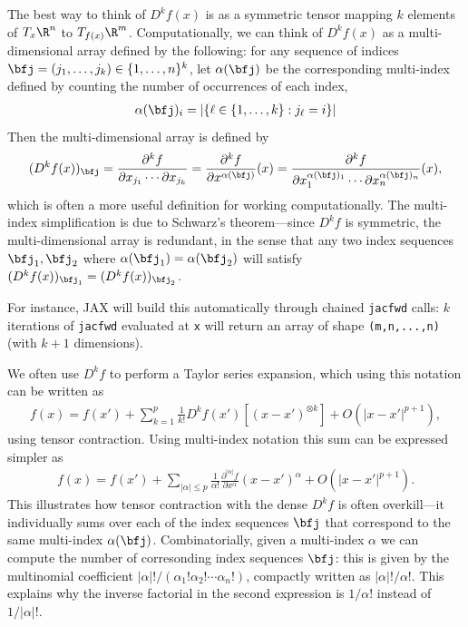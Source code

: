 \documentclass{article}
\theoremstyle{plain}
\theoremstyle{remark}
\begin{document}
The best way to think of $D^kf(x)$ is as a symmetric tensor mapping $k$ elements of $T_x\R^n$ to $T_{f(x)}\R^m$. 
Computationally, we can think of $D^kf(x)$ as a multi-dimensional array defined by the following: for any sequence of indices $\bfj = (j_1,\dots,j_k) \in \{1,\dots,n\}^k$, 
let $\alpha(\bfj)$ be the corresponding multi-index defined by counting the number of occurrences of each index,
\begin{align*}
    \alpha(\bfj)_i = |\{\ell\in\{1,\dots,k\} : j_\ell = i\}|
\end{align*}
Then the multi-dimensional array is defined by
\begin{align*}
    (D^kf(x))_{\bfj} 
    = \frac{\partial^k f}{\partial x_{j_1} \cdots \partial x_{j_k}} 
    = \frac{\partial^k f}{\partial x^{\alpha(\bfj)}}(x) = \frac{\partial^k f}{\partial x^{\alpha(\bfj)_1}_1 \cdots\partial x^{\alpha(\bfj)_n}_n} (x),
\end{align*}
which is often a more useful definition for working computationally.
The multi-index simplification is due to Schwarz's theorem---since $D^kf$ is symmetric, the multi-dimensional array is redundant, in the sense that any two index sequences $\bfj_1, \bfj_2$ where $\alpha(\bfj_1) = \alpha(\bfj_2)$ will satisfy $(D^kf(x))_{\bfj_1} = (D^kf(x))_{\bfj_2}$.

For instance, JAX will build this automatically through chained \verb|jacfwd| calls: $k$ iterations of \verb|jacfwd| evaluated at \verb|x| will return an array of shape \verb|(m,n,...,n)| (with $k+1$ dimensions). 

We often use $D^kf$ to perform a Taylor series expansion, which using this notation can be written as
\begin{align*}
    f(x) = f(x') + \sum_{k=1}^p \frac1{k!} D^kf(x') [(x - x')^{\otimes k}] + O(|x - x'|^{p+1}),
\end{align*}
using tensor contraction. 
Using multi-index notation this sum can be expressed simpler as
\begin{align*}
    f(x) = f(x') + \sum_{|\alpha| \leq p} \frac{1}{\alpha!} \frac{\partial^{|\alpha|}f}{\partial x^\alpha} (x - x')^\alpha + O(|x - x'|^{p+1}).
\end{align*}
This illustrates how tensor contraction with the dense $D^kf$ is often overkill---it individually sums over each of the index sequences $\bfj$ that correspond to the same multi-index $\alpha(\bfj)$.
Combinatorially, given a multi-index $\alpha$ we can compute the number of corresonding index sequences $\bfj$: this is given by the multinomial coefficient $|\alpha|!/(\alpha_1!\alpha_2!\cdots\alpha_n!)$, compactly written as $|\alpha|!/\alpha!$.
This explains why the inverse factorial in the second expression is $1/\alpha!$ instead of $1/|\alpha|!$.
\end{document}
